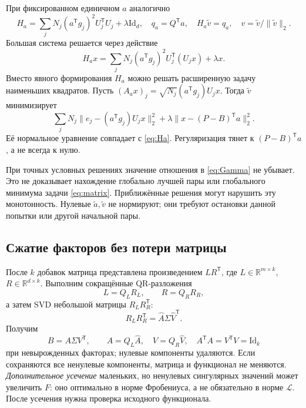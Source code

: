 \documentclass[11pt,a4paper]{article}
\numberwithin{equation}{section}
\theoremstyle{remark}
\newcommand{\R}{\mathbb R}
\newcommand{\Id}{\mathrm{Id}}
\newcommand{\T}{^{\mathsf T}}
\begin{document}
При фиксированном единичном $a$ аналогично
\begin{equation}\label{eq:Ha}
 H_a=\sum_jN_j(a\T g_j)^2U_j\T U_j+\lambda\Id_d,
 \quad q_a=Q\T a,
 \quad H_a\widetilde v=q_a,
 \quad v=\widetilde v/\|\widetilde v\|_2.
\end{equation}
Большая система решается через действие
\[
 H_ax=\sum_jN_j(a\T g_j)^2U_j\T(U_jx)+\lambda x.
\]
Вместо явного формирования $H_a$ можно решать расширенную задачу
наименьших квадратов. Пусть $(A_ax)_j=\sqrt{N_j}(a\T g_j)U_jx$.
Тогда $\widetilde v$ минимизирует
\begin{equation}\label{eq:vls}
 \sum_jN_j\|e_j-(a\T g_j)U_jx\|_2^2
 +\lambda\|x-(P-B)\T a\|_2^2.
\end{equation}
Её нормальное уравнение совпадает с \eqref{eq:Ha}. Регуляризация тянет
к $(P-B)\T a$, а не всегда к нулю.

При точных условных решениях значение отношения в \eqref{eq:Gamma}
не убывает. Это не доказывает нахождение глобально лучшей пары или
глобального минимума задачи \eqref{eq:matrix}. Приближённые решения могут
нарушить эту монотонность. Нулевые $\widetilde a,\widetilde v$ не нормируют;
они требуют остановки данной попытки или другой начальной пары.

\subsection{Сжатие факторов без потери матрицы}
После $k$ добавок матрица представлена произведением $LR\T$, где
$L\in\R^{m\times k}$, $R\in\R^{d\times k}$. Выполним сокращённые
QR-разложения
\[
 L=Q_LR_L,\qquad R=Q_RR_R,
\]
а затем SVD небольшой матрицы $R_LR_R\T$:
\[
 R_LR_R\T=\widehat A\Sigma\widehat V\T.
\]
Получим
\begin{equation}\label{eq:compact}
 B=A\Sigma V\T,
 \qquad A=Q_L\widehat A,\quad V=Q_R\widehat V,
 \quad A\T A=V\T V=\Id_k
\end{equation}
при невырожденных факторах; нулевые компоненты удаляются.
Если сохраняются все ненулевые компоненты, матрица и функционал не меняются.
\emph{Дополнительное усечение} маленьких, но ненулевых сингулярных значений
может увеличить $F$: оно оптимально в норме Фробениуса, а не обязательно
в норме $\mathcal L$. После усечения нужна проверка исходного функционала.
\end{document}
